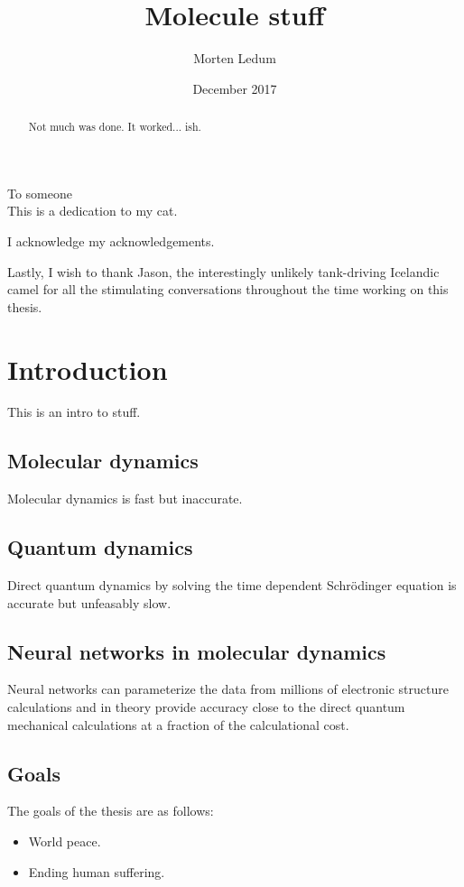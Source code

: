 \documentclass[twoside,english]{uiofysmaster}
\author{Morten Ledum}
\title{Molecule stuff}
\date{December 2017}
\begin{document}
\newcommand{\mainfile}{}
\maketitle

\begin{abstract}
Not much was done. It worked... ish.
\end{abstract}


\begin{dedication}
  To someone
  \\\vspace{12pt}
  This is a dedication to my cat.
\end{dedication}

\begin{acknowledgements}
  I acknowledge my acknowledgements.

  Lastly, I wish to thank Jason, the interestingly unlikely tank-driving Icelandic camel for all the stimulating conversations throughout the time working on this thesis.
\end{acknowledgements}

\tableofcontents

\chapter{Introduction}
This is an intro to stuff.

\section{Molecular dynamics}
Molecular dynamics is fast but inaccurate.

\section{Quantum dynamics}
Direct quantum dynamics by solving the time dependent Schrödinger equation is accurate but unfeasably slow.

\section{Neural networks in molecular dynamics}
Neural networks can parameterize the data from millions of electronic structure calculations and in theory provide accuracy close to the direct quantum mechanical calculations at a fraction of the calculational cost.

\section{Goals}
The goals of the thesis are as follows:
\begin{itemize}
  \item World peace.
  \item Ending human suffering.
\end{itemize}
\end{document}
